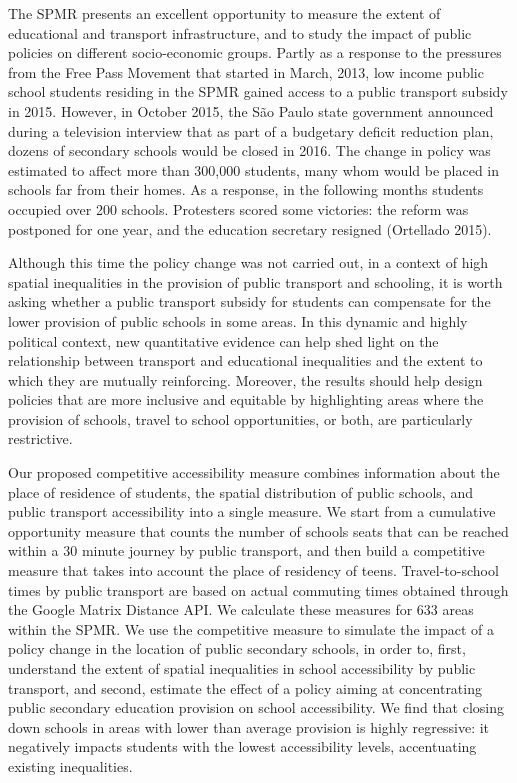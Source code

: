 \documentclass[]{article}
\begin{document}
The SPMR presents an excellent opportunity to measure the extent of
educational and transport infrastructure, and to study the impact of
public policies on different socio-economic groups. Partly as a response
to the pressures from the Free Pass Movement that started in March,
2013, low income public school students residing in the SPMR gained
access to a public transport subsidy in 2015. However, in October 2015,
the São Paulo state government announced during a television interview
that as part of a budgetary deficit reduction plan, dozens of secondary
schools would be closed in 2016. The change in policy was estimated to
affect more than 300,000 students, many whom would be placed in schools
far from their homes. As a response, in the following months students
occupied over 200 schools. Protesters scored some victories: the reform
was postponed for one year, and the education secretary resigned
(Ortellado 2015).

Although this time the policy change was not carried out, in a context
of high spatial inequalities in the provision of public transport and
schooling, it is worth asking whether a public transport subsidy for
students can compensate for the lower provision of public schools in
some areas. In this dynamic and highly political context, new
quantitative evidence can help shed light on the relationship between
transport and educational inequalities and the extent to which they are
mutually reinforcing. Moreover, the results should help design policies
that are more inclusive and equitable by highlighting areas where the
provision of schools, travel to school opportunities, or both, are
particularly restrictive.

Our proposed competitive accessibility measure combines information
about the place of residence of students, the spatial distribution of
public schools, and public transport accessibility into a single
measure. We start from a cumulative opportunity measure that counts the
number of schools seats that can be reached within a 30 minute journey
by public transport, and then build a competitive measure that takes
into account the place of residency of teens. Travel-to-school times by
public transport are based on actual commuting times obtained through
the Google Matrix Distance API. We calculate these measures for 633
areas within the SPMR. We use the competitive measure to simulate the
impact of a policy change in the location of public secondary schools,
in order to, first, understand the extent of spatial inequalities in
school accessibility by public transport, and second, estimate the
effect of a policy aiming at concentrating public secondary education
provision on school accessibility. We find that closing down schools in
areas with lower than average provision is highly regressive: it
negatively impacts students with the lowest accessibility levels,
accentuating existing inequalities.
\end{document}
